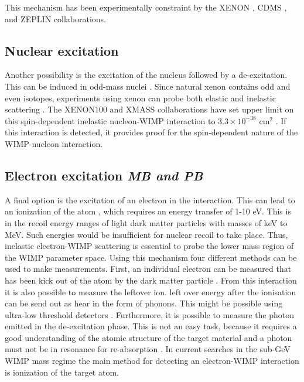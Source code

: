 \documentclass{article}
\begin{document}
This mechanism has been experimentally constraint by the XENON \cite{Aprile:2011ts}, CDMS \cite{Arrenberg:2011zz}, and ZEPLIN \cite{Akimov:2010vk} collaborations. 


\subsection{Nuclear excitation} 
Another possibility is the excitation of the nucleus followed by a de-excitation. This can be induced in odd-mass nuclei \cite{Baudis:2013bba}. Since natural xenon contains odd and even isotopes, experiments using xenon can probe both elastic and inelastic scattering \cite{McCabe:2015eia}. The XENON100 and XMASS collaborations have set upper limit on this spin-dependent inelastic nucleon-WIMP interaction to $3.3 \times 10^{-38}$ cm$^2$ \cite{Uchida:2014cnn, Aprile:2017ngb}. If this interaction is detected, it provides proof for the spin-dependent nature of the WIMP-nucleon interaction. 

\subsection{Electron excitation \small{\textit{MB and PB}}} \label{sec:electron_exc}

A final option is the excitation of an electron in the interaction. This can lead to an ionization of the atom \cite{Essig:2011nj}, which requires an energy transfer of 1-10 eV. This is in the recoil energy ranges of light dark matter particles with masses of keV to MeV. Such energies would be insufficient for nuclear recoil to take place. Thus, inelastic electron-WIMP scattering is essential to probe the lower mass region of the WIMP parameter space. Using this mechanism four different methods can be used to make measurements. First, an individual electron can be measured that has been kick out of the atom by the dark matter particle \cite{Bernabei:2007gr, Kopp:2009et, Dedes:2009bk}. From this interaction it is also possible to measure the leftover ion. left over energy after the ionisation can be send out as hear in the form of phonons. This might be possible using ultra-low threshold detectors \cite{Formaggio:2011jt}. Furthermore, it is possible to measure the photon emitted in the de-excitation phase. This is not an easy task, because it requires a good understanding of the atomic structure of the target material and a photon must not be in resonance for re-absorption \cite{Starkman:1994gf}. In current searches in the sub-GeV WIMP mass regime the main method for detecting an electron-WIMP interaction is ionization of the target atom.
\end{document}
